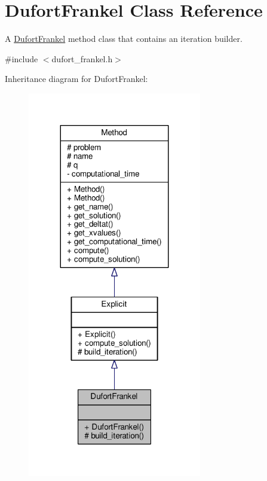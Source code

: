 \hypertarget{classDufortFrankel}{}\section{Dufort\+Frankel Class Reference}
\label{classDufortFrankel}


A \hyperlink{classDufortFrankel}{Dufort\+Frankel} method class that contains an iteration builder.  




{\ttfamily \#include $<$dufort\+\_\+frankel.\+h$>$}



Inheritance diagram for Dufort\+Frankel\+:
\nopagebreak
\begin{figure}[H]
\begin{center}
\leavevmode
\includegraphics[width=215pt]{classDufortFrankel__inherit__graph}
\end{center}
\end{figure}


